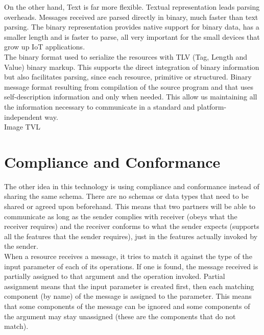 On the other hand, Text is far more flexible. Textual representation leads parsing overheads. Messages received are parsed
directly in binary, much faster than text parsing. The binary representation provides native support for binary data, has a
smaller length and is faster to parse, all very important for the small devices that grow up IoT applications.\\

The binary format used to serialize the resources with TLV (Tag, Length and Value) binary markup. This supports the direct
integration of binary information but also facilitates parsing, since each resource, primitive or structured. Binary message
format resulting from compilation of the source program and that uses self-description information and only when needed.
This allow us maintaining all the information necessary to communicate in a standard and platform-independent way.\\

Image TVL


\section{Compliance and Conformance}
\label{section:Compliance}

The other idea in this technology is using compliance and conformance instead of sharing the same schema. There are no
schemas or data types that need to be shared or agreed upon beforehand. This means that two partners will be able to
communicate as long as the sender complies with receiver (obeys what the receiver requires) and the receiver conforms to
what the sender expects (supports all the features that the sender requires), just in the features actually invoked by the
sender.\\

When a resource receives a message, it tries to match it against the type of the input parameter of each of its operations.
If one is found, the message received is partially assigned to that argument and the operation invoked. Partial assignment
means that the input parameter is created first, then each matching component (by name) of the message is assigned to the
parameter. This means that some components of the message can be ignored and some components of the argument may stay
unassigned (these are the components that do not match).\\

